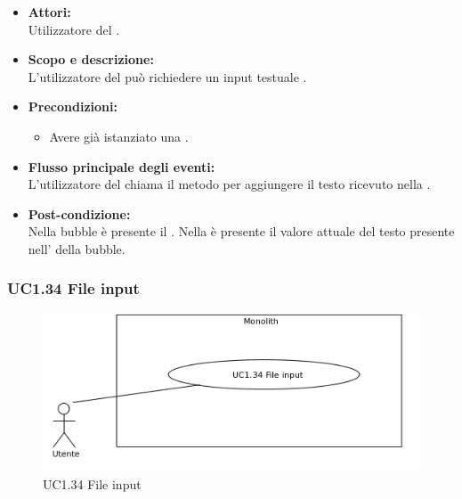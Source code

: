 \begin{itemize}
	\item \textbf{Attori:}
	\\Utilizzatore del .
	\item \textbf{Scopo e descrizione:} 
	\\L’utilizzatore del  può richiedere un input testuale .
	\item \textbf{Precondizioni:}
	\begin{itemize}
		\item Avere già istanziato una .
	\end{itemize}
	\item \textbf{Flusso principale degli eventi:}
	\\L’utilizzatore del  chiama il metodo per aggiungere il testo ricevuto nella .
	\item \textbf{Post-condizione:}
	\\Nella bubble è presente il . Nella  è presente il valore attuale del testo presente nell’ della bubble.
\end{itemize}

\subsubsection{UC1.34 File input} \label{UC1.34}

\begin{figure}[H]
	\centering
	\includegraphics[width=15cm]{../../documenti/AnalisiDeiRequisiti/Diagrammi_img/uc1_34.png}
	\caption{UC1.34 File input}
\end{figure}

